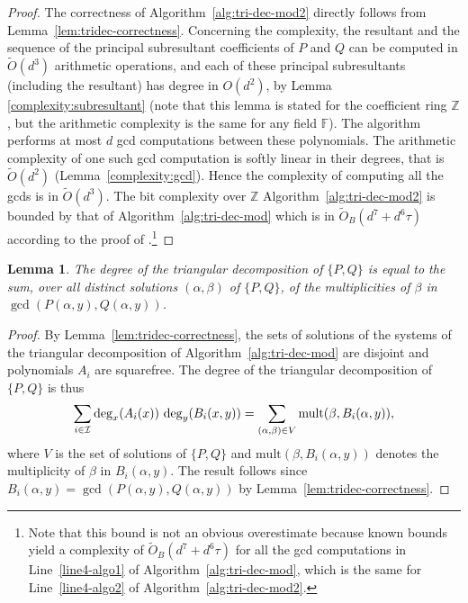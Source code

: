 \documentclass{sig-alternate}
\newtheorem{lemma}[theorem]{Lemma}
\newcommand {\Z}   {\mathbb Z}
\newcommand{\OO}{\ensuremath{{{O}}}}
\newcommand{\sO}{\ensuremath{\widetilde{{O}}}}
\newcommand{\sOB}{\ensuremath{\widetilde{{O}}_B}}
\begin{document}
\begin{proof}
The correctness of Algorithm~\ref{alg:tri-dec-mod2} directly follows from
Lemma~\ref{lem:tridec-correctness}. Concerning the complexity, the resultant and the sequence of the principal subresultant coefficients of $P$ and $Q$ can be computed in
  $\sO(d^3)$ arithmetic operations, and each of these principal subresultants (including the
  resultant) has degree in $\OO(d^2)$, by  Lemma \ref{complexity:subresultant} (note that this lemma is stated for
  the coefficient ring $\Z$, but the arithmetic complexity is the same for any
  field $\mathbb{F}$).
  The algorithm performs at most $d$ gcd computations between these polynomials. 
  The arithmetic complexity of one such gcd computation is softly
  linear in their degrees, that is $\sO(d^2)$
  (Lemma~\ref{complexity:gcd}). Hence the complexity of computing 
  all the gcds is in $\sO(d^3)$. 
The bit complexity over $\mathbb{Z}$ Algorithm~\ref{alg:tri-dec-mod2} is bounded by that of
  Algorithm~\ref{alg:tri-dec-mod} which is in $\sOB(d^7+d^6\tau)$ according to the proof of
  \cite[Thm. 19]{det-jsc-2009}.\footnote{\small Note that this bound is not an obvious overestimate because  known bounds yield a complexity of $\sOB(d^7+d^6\tau)$ for all the gcd computations
  in Line~\ref{line4-algo1} of Algorithm~\ref{alg:tri-dec-mod}, which is the
  same for Line~\ref{line4-algo2} of Algorithm~\ref{alg:tri-dec-mod2}.}
\end{proof}




\begin{lemma}\label{lem:mult} 
The degree of the triangular decomposition of $\{P,Q\}$ is equal to the sum, over all distinct
solutions $(\alpha,\beta)$ of $\{P,Q\}$,  of the multiplicities of $\beta$ in $\gcd(P(\alpha,y),Q(\alpha,y))$. 
\end{lemma}
\begin{proof}
By Lemma~\ref{lem:tridec-correctness}, the sets of solutions of the systems of the triangular decomposition of
Algorithm~\ref{alg:tri-dec-mod} are disjoint and polynomials $A_i$ are squarefree. The degree of the
triangular decomposition of $\{P,Q\}$ is thus 
\[\sum_{i\in\cal I}{\deg_x(A_i(x))\,\deg_y(B_i(x,y))}= 
\sum_{(\alpha,\beta) \in V}\text{mult}(\beta,B_i(\alpha,y)),\]
where $V$ is the set of solutions of $\{P,Q\}$ and $\text{mult}(\beta,B_i(\alpha,y))$ denotes the multiplicity of $\beta$ in $B_i(\alpha,y)$.
The result follows since  $B_i(\alpha,y)= \gcd(P(\alpha,y),Q(\alpha,y))$ by Lemma~\ref{lem:tridec-correctness}.
\end{proof}
\end{document}
